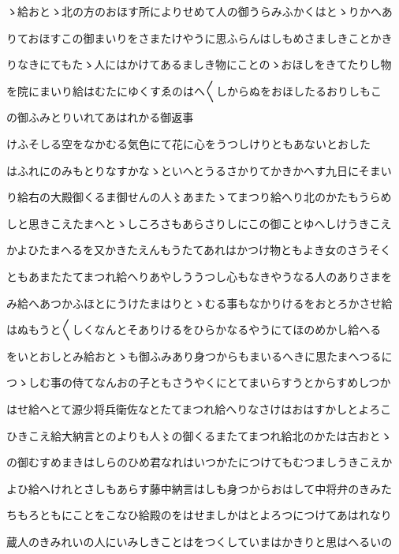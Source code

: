\documentclass[a4paper,11pt,landscape]{ltjtarticle}
\begin{document}
\par\medskip
ゝ給おとゝ北の方のおほす所によりせめて人の御うらみふかくはとゝりかへあ
\par\medskip
りておほすこの御まいりをさまたけやうに思ふらんはしもめさましきことかき
\par\medskip
りなきにてもたゝ人にはかけてあるましき物にことのゝおほしをきてたりし物
\par\medskip
を院にまいり給はむたにゆくすゑのはへ〱しからぬをおほしたるおりしもこ
\par\medskip
の御ふみとりいれてあはれかる御返事
\par\medskip
けふそしる空をなかむる気色にて花に心をうつしけりともあないとおした
\par\medskip
はふれにのみもとりなすかなゝといへとうるさかりてかきかへす九日にそまい
\par\medskip
り給右の大殿御くるま御せんの人〻あまたゝてまつり給へり北のかたもうらめ
\par\medskip
しと思きこえたまへとゝしころさもあらさりしにこの御ことゆへしけうきこえ
\par\medskip
かよひたまへるを又かきたえんもうたてあれはかつけ物ともよき女のさうそく
\par\medskip
ともあまたたてまつれ給へりあやしううつし心もなきやうなる人のありさまを
\par\medskip
み給へあつかふほとにうけたまはりとゝむる事もなかりけるをおとろかさせ給
\par\medskip
はぬもうと〱しくなんとそありけるをひらかなるやうにてほのめかし給へる
\par\medskip
をいとおしとみ給おとゝも御ふみあり身つからもまいるへきに思たまへつるに
\par\medskip
つゝしむ事の侍てなんおの子ともさうやくにとてまいらすうとからすめしつか
\par\medskip
はせ給へとて源少将兵衛佐なとたてまつれ給へりなさけはおはすかしとよろこ
\par\medskip
ひきこえ給大納言とのよりも人〻の御くるまたてまつれ給北のかたは古おとゝ
\par\medskip
の御むすめまきはしらのひめ君なれはいつかたにつけてもむつましうきこえか
\par\medskip
よひ給へけれとさしもあらす藤中納言はしも身つからおはして中将弁のきみた
\par\medskip
ちもろともにことをこなひ給殿のをはせましかはとよろつにつけてあはれなり
\par\medskip
蔵人のきみれいの人にいみしきことはをつくしていまはかきりと思はへるいの
\par\medskip
\end{document}

